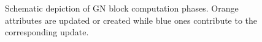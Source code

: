 \begin{figure}[H]
    \captionsetup{width=\dimexpr\textwidth-1.5cm\relax}
    \caption{Schematic depiction of GN block computation phases. 
    \textcolor{tum-orange}{Orange} attributes are updated or created 
    while \textcolor{tum-dark-blue}{blue} ones contribute to the corresponding 
    update.}

\end{figure}